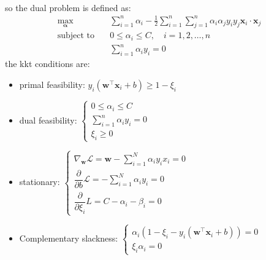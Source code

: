 \begin{qsolve}
\begin{qsolve}[]
\begin{align*}
        \end{align*}
        so the dual problem is defined as:
        \begin{align*}
            \max_{\boldsymbol{\alpha}} & \quad \sum_{i=1}^{n} \alpha_i - \frac{1}{2} \sum_{i=1}^{n} \sum_{j=1}^{n} \alpha_i \alpha_j y_i y_j \mathbf{x}_i \cdot \mathbf{x}_j \\
            \text{subject to} & \quad 0 \leq \alpha_i \leq C, \quad i = 1, 2, \ldots, n \\
            & \quad \sum_{i=1}^{n} \alpha_i y_i = 0
        \end{align*}
        the kkt conditions are:
        \begin{itemize}
			\item primal feasibility:
			$
            y_i (\mathbf{w}^\top \mathbf{x}_i + b) \geq 1 - \xi_i
			$
			\item dual feasibility:
			$
			\left\{
			\begin{array}{ll}
                0 \leq \alpha_i \leq C \\
                \sum_{i=1}^n \alpha_i y_i = 0 \\
                \xi_i \geq 0
			\end{array}
			\right.
			$
			\item stationary:
			$
			\left\{
			\begin{array}{ll}
				\nabla_{\textbf{w}}\mathcal{L} = \textbf{w} - \sum\limits_{i=1}^{N}\alpha_iy_ix_i = 0\\
				\dfrac{\partial}{\partial b}\mathcal{L} = -\sum\limits_{i=1}^{N}\alpha_iy_i = 0\\
				\dfrac{\partial }{\partial \xi_i}L = C - \alpha_i - \beta_i = 0
			\end{array}
			\right.
			$
			\item Complementary slackness:
			$
			\left\{
			\begin{array}{ll}
                \alpha_i (1 - \xi_i - y_i (\mathbf{w}^\top \mathbf{x}_i + b)) = 0 \\
                \xi_i \alpha_i = 0
			\end{array}
			\right.
			$
		\end{itemize}

    \end{qsolve}
\end{qsolve}
